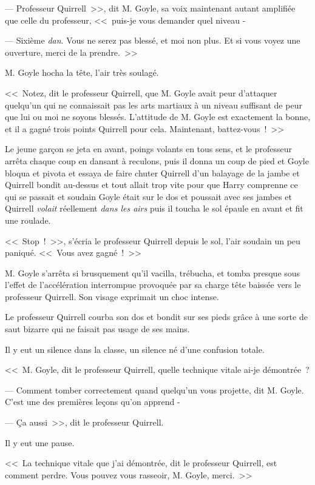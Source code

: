 --- Professeur Quirrell~>>, dit M. Goyle, sa voix maintenant autant amplifiée que celle du professeur, <<~puis-je vous demander quel niveau -

--- Sixième \emph{dan}. Vous ne serez pas blessé, et moi non plus. Et si vous voyez une ouverture, merci de la prendre.~>>

M. Goyle hocha la tête, l'air très soulagé.

<<~Notez, dit le professeur Quirrell, que M. Goyle avait peur d'attaquer quelqu'un qui ne connaissait pas les arts martiaux à un niveau suffisant de peur que lui ou moi ne soyons blessés. L'attitude de M. Goyle est exactement la bonne, et il a gagné trois points Quirrell pour cela. Maintenant, battez-vous~!~>>

Le jeune garçon se jeta en avant, poings volants en tous sens, et le professeur arrêta chaque coup en dansant à reculons, puis il donna un coup de pied et Goyle bloqua et pivota et essaya de faire chuter Quirrell d'un balayage de la jambe et Quirrell bondit au-dessus et tout allait trop vite pour que Harry comprenne ce qui se passait et soudain Goyle était sur le dos et poussait avec ses jambes et Quirrell \emph{volait} réellement \emph{dans les airs} puis il toucha le sol épaule en avant et fit une roulade.

<<~Stop~!~>>, s'écria le professeur Quirrell depuis le sol, l'air soudain un peu paniqué. <<~Vous avez gagné~!~>>

M. Goyle s'arrêta si brusquement qu'il vacilla, trébucha, et tomba presque sous l'effet de l'accélération interrompue provoquée par sa charge tête baissée vers le professeur Quirrell. Son visage exprimait un choc intense.

Le professeur Quirrell courba son dos et bondit sur ses pieds grâce à une sorte de saut bizarre qui ne faisait pas usage de ses mains.

Il y eut un silence dans la classe, un silence né d'une confusion totale.

<<~M. Goyle, dit le professeur Quirrell, quelle technique vitale ai-je démontrée~?

--- Comment tomber correctement quand quelqu'un vous projette, dit M. Goyle. C'est une des premières leçons qu'on apprend -

--- Ça aussi~>>, dit le professeur Quirrell.

Il y eut une pause.

<<~La technique vitale que j'ai démontrée, dit le professeur Quirrell, est comment perdre. Vous pouvez vous rasseoir, M. Goyle, merci.~>>

